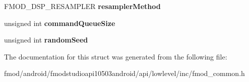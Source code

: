\begin{DoxyCompactItemize}
\item 
\hypertarget{struct_f_m_o_d___a_d_v_a_n_c_e_d_s_e_t_t_i_n_g_s_aa38ed5b1d8624386170ca539779250b8}{F\+M\+O\+D\+\_\+\+D\+S\+P\+\_\+\+R\+E\+S\+A\+M\+P\+L\+E\+R {\bfseries resampler\+Method}}\label{struct_f_m_o_d___a_d_v_a_n_c_e_d_s_e_t_t_i_n_g_s_aa38ed5b1d8624386170ca539779250b8}

\item 
\hypertarget{struct_f_m_o_d___a_d_v_a_n_c_e_d_s_e_t_t_i_n_g_s_ab9f6edd30759fea6cb6a5ba54b3656d5}{unsigned int {\bfseries command\+Queue\+Size}}\label{struct_f_m_o_d___a_d_v_a_n_c_e_d_s_e_t_t_i_n_g_s_ab9f6edd30759fea6cb6a5ba54b3656d5}

\item 
\hypertarget{struct_f_m_o_d___a_d_v_a_n_c_e_d_s_e_t_t_i_n_g_s_a183a5d91e117a0b7fd984cc82cc2c6ed}{unsigned int {\bfseries random\+Seed}}\label{struct_f_m_o_d___a_d_v_a_n_c_e_d_s_e_t_t_i_n_g_s_a183a5d91e117a0b7fd984cc82cc2c6ed}

\end{DoxyCompactItemize}


The documentation for this struct was generated from the following file\+:\begin{DoxyCompactItemize}
\item 
fmod/android/fmodstudioapi10503android/api/lowlevel/inc/fmod\+\_\+common.\+h\end{DoxyCompactItemize}
